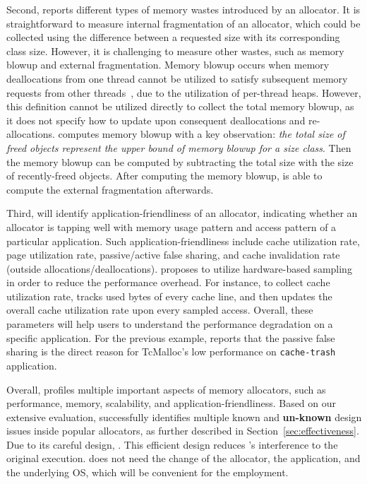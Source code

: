 Second, \MP{} reports different types of memory wastes introduced by an allocator. It is straightforward to measure internal fragmentation of an allocator, which could be collected using the difference between a requested size with its corresponding class size. However, it is challenging to measure other wastes, such as memory blowup and external fragmentation. Memory blowup occurs when memory deallocations from one thread cannot be utilized to satisfy subsequent memory requests from other threads~\cite{Hoard}, due to the utilization of per-thread heaps. However, this definition cannot be utilized directly to collect the total memory blowup, as it does not specify how to update upon consequent deallocations and re-allocations. \MP{} computes memory blowup with a key observation: \textit{the total size of freed objects represent the upper bound of memory blowup for a size class}. Then the memory blowup can be computed by subtracting the total size with the size of recently-freed objects. After computing the memory blowup, \MP{} is able to compute the external fragmentation afterwards. 

Third, \MP{} will identify application-friendliness of an allocator, indicating whether an allocator is tapping well with memory usage pattern and access pattern of a particular application. Such application-friendliness include cache utilization rate, page utilization rate, passive/active false sharing, and cache invalidation rate (outside allocations/deallocations). \MP{} proposes to utilize hardware-based sampling in order to reduce the performance overhead. For instance, to collect cache utilization rate, \MP{} tracks used bytes of every cache line, and then updates the overall cache utilization rate upon every sampled access. Overall, these parameters will help users to understand the performance degradation on a specific application. For the previous example, \MP{} reports that the passive false sharing is the direct reason for TcMalloc's low performance on \texttt{cache-trash} application.

Overall, \MP{} profiles multiple important aspects of memory allocators, such as performance, memory, scalability, and application-friendliness. Based on our extensive evaluation, \MP{} successfully identifies multiple known and \textbf{un-known} design issues inside popular allocators, as further described in Section~\ref{sec:effectiveness}. Due to its careful design, . This efficient design reduces \MP{}'s interference to the original execution. \MP{} does not need the change of the allocator, the application, and the underlying OS, which will be convenient for the employment. 


